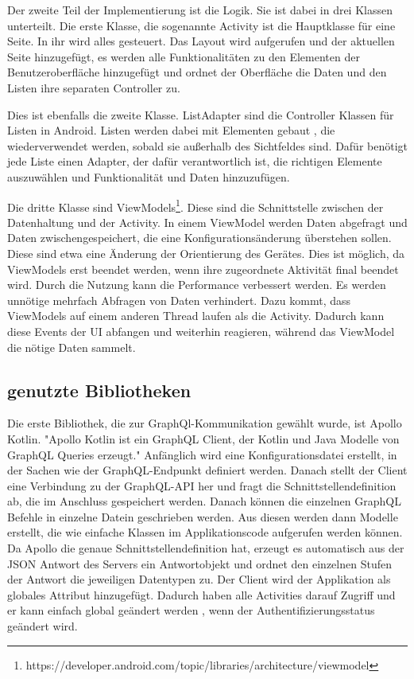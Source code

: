 Der zweite Teil der Implementierung ist die Logik. Sie ist dabei in drei Klassen unterteilt. 
Die erste Klasse, die sogenannte Activity ist die Hauptklasse für eine Seite. In ihr wird alles gesteuert. Das Layout wird aufgerufen und der aktuellen Seite hinzugefügt, es werden alle Funktionalitäten zu den Elementen der Benutzeroberfläche hinzugefügt und ordnet der Oberfläche die Daten und den Listen ihre separaten Controller zu.

Dies ist ebenfalls die zweite Klasse. ListAdapter sind die Controller Klassen für Listen in Android. Listen werden dabei mit Elementen gebaut , die wiederverwendet werden, sobald sie außerhalb des Sichtfeldes sind. Dafür benötigt jede Liste einen Adapter, der dafür verantwortlich ist, die richtigen Elemente auszuwählen und Funktionalität und Daten hinzuzufügen.

Die dritte Klasse sind ViewModels\footnote{https://developer.android.com/topic/libraries/architecture/viewmodel}. Diese sind die Schnittstelle zwischen der Datenhaltung und der Activity. In einem ViewModel werden Daten abgefragt und Daten zwischengespeichert, die eine Konfigurationsänderung überstehen sollen. Diese sind etwa eine Änderung der Orientierung des Gerätes. Dies ist möglich, da ViewModels erst beendet werden, wenn ihre zugeordnete Aktivität final beendet wird. 
Durch die Nutzung kann die Performance verbessert werden. Es werden unnötige mehrfach Abfragen von Daten verhindert. Dazu kommt, dass ViewModels auf einem anderen Thread laufen als die Activity. Dadurch kann diese Events der \ac{UI} abfangen und weiterhin reagieren, während das ViewModel die nötige Daten sammelt.


\subsection{genutzte Bibliotheken}
Die erste Bibliothek, die zur GraphQl-Kommunikation gewählt wurde, ist Apollo Kotlin. 
"Apollo Kotlin ist ein GraphQL Client, der Kotlin und Java Modelle von GraphQL Queries erzeugt."\cite{Apollo_kotlin_docs} 
Anfänglich wird eine Konfigurationsdatei erstellt, in der Sachen wie der GraphQL-Endpunkt definiert werden. 
Danach stellt der Client eine Verbindung zu der GraphQL-\ac{API} her und fragt die Schnittstellendefinition ab, die im Anschluss gespeichert werden. 
Danach können die einzelnen GraphQL Befehle in einzelne Datein geschrieben werden. Aus diesen werden dann Modelle erstellt, die wie einfache Klassen im Applikationscode aufgerufen werden können.
Da Apollo die genaue Schnittstellendefinition hat, erzeugt es automatisch aus der \ac{JSON} Antwort des Servers ein Antwortobjekt und ordnet den einzelnen Stufen der Antwort die jeweiligen Datentypen zu.
Der Client wird der Applikation als globales Attribut hinzugefügt. Dadurch haben alle Activities darauf Zugriff und er kann einfach global geändert werden , wenn der Authentifizierungsstatus geändert wird.

